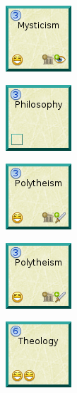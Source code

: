 \documentclass{article}
\begin{document}
\begin{figure}
  \begin{subfigure}{}
    \includegraphics[scale=1]{../rules/png/doe_tech_mysticism.png}
  \end{subfigure}
  \begin{subfigure}{}
    \includegraphics[scale=1]{../rules/png/doe_tech_philosophy.png}
  \end{subfigure}
  \begin{subfigure}{}
    \includegraphics[scale=1]{../rules/png/doe_tech_polytheism.png}
  \end{subfigure}
  \begin{subfigure}{}
    \includegraphics[scale=1]{../rules/png/doe_tech_polytheism.png}
  \end{subfigure}
  \begin{subfigure}{}
    \includegraphics[scale=1]{../rules/png/doe_tech_theology.png}
  \end{subfigure}
\end{figure}
\end{document}

